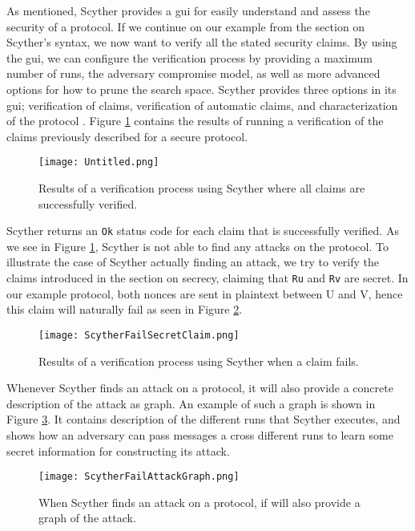 As mentioned, Scyther provides a \gls{gui} for easily understand and assess the security of a protocol. 
If we continue on our example from the section on Scyther's syntax, we now want to verify all the stated security claims. By using the \gls{gui}, we can configure the verification process by providing a maximum number of runs, the adversary compromise model, as well as more advanced options for how to prune the search space. Scyther provides three options in its \gls{gui}; verification of claims, verification of automatic claims, and characterization of the protocol \cite{cremers2008scyther}. Figure \ref{fig:scyther-verify-claims} contains the results of running a verification of the claims previously described for a secure protocol.

\begin{figure}[h]
	\centering
	\texttt{[image: Untitled.png]}
	\caption{Results of a verification process using Scyther where all claims are successfully verified.}
	\label{fig:scyther-verify-claims}
\end{figure}


Scyther returns an \texttt{Ok} status code for each claim that is successfully verified. As we see in Figure \ref{fig:scyther-verify-claims}, Scyther is not able to find any attacks on the protocol. To illustrate the case of Scyther actually finding an attack, we try to verify the claims introduced in the section on secrecy, claiming that \texttt{Ru} and \texttt{Rv} are secret. In our example protocol, both nonces are sent in plaintext between U and V, hence this claim will naturally fail as seen in Figure \ref{fig:scyther-verify-claims-fail}.

\begin{figure}[h]
	\centering
	\texttt{[image: ScytherFailSecretClaim.png]}
	\caption{Results of a verification process using Scyther when a claim fails.}
	\label{fig:scyther-verify-claims-fail}
\end{figure}

Whenever Scyther finds an attack on a protocol, it will also provide a concrete description of the attack as graph. An example of such a graph is shown in Figure \ref{fig:scyther-graph}. It contains description of the different runs that Scyther executes, and shows how an adversary can pass messages a cross different runs to learn some secret information for constructing its attack.

\begin{figure}[h]
	\centering
	\texttt{[image: ScytherFailAttackGraph.png]}
	\caption{When Scyther finds an attack on a protocol, if will also provide a graph of the attack.}
	\label{fig:scyther-graph}
\end{figure}

